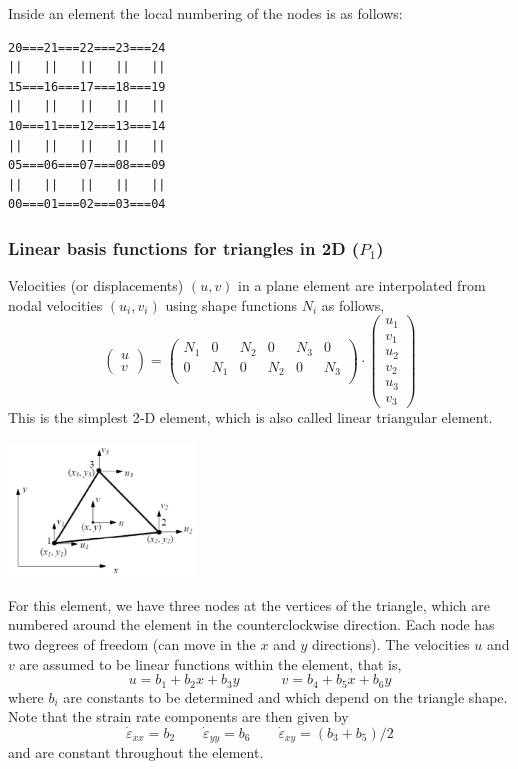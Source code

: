Inside an element the local numbering of the nodes is as follows:
\begin{verbatim}
20===21===22===23===24
||   ||   ||   ||   ||
15===16===17===18===19 
||   ||   ||   ||   || 
10===11===12===13===14 
||   ||   ||   ||   || 
05===06===07===08===09 
||   ||   ||   ||   || 
00===01===02===03===04 
\end{verbatim}




\subsubsection{Linear basis functions for triangles in 2D ($P_1$)}\label{ss:p1}

Velocities (or displacements) $(u,v)$ in a plane element are interpolated from nodal velocities
$(u_i,v_i)$ using shape functions $N_i$ as follows,
\[
\left(
\begin{array}{c}
u \\v
\end{array}
\right)
=
\left(
\begin{array}{cccccc}
N_1 & 0 & N_2 & 0 & N_3 & 0\\
0 & N_1 & 0 & N_2 & 0 & N_3\\
\end{array}
\right)
\cdot
\left(
\begin{array}{c}
u_1 \\ v_1 \\ u_2 \\ v_2 \\ u_3 \\ v_3
\end{array}
\right)
\]
This is the simplest 2‐D element, which is also called linear triangular element.
\begin{center}
\includegraphics[width=5cm]{images/shapefunctions/triangleFEM1}
\end{center}

For this element, we have three nodes at the vertices of the triangle, which are 
numbered around the element in the counterclockwise direction. 
Each node has two degrees of freedom (can move in the $x$ and $y$ directions). 
The velocities $u$ and $v$ are assumed to be linear functions within the element, that is, 
\[
u=b_1 +b_2x+b_3y
\quad\quad\quad
v=b_4 +b_5x+b_6y
\]
where $b_i$ are constants to be determined and which depend on the triangle shape.
Note that the strain rate components are then given by
\[
\dot\varepsilon_{xx}=b_2 
\quad\quad
\dot\varepsilon_{yy}=b_6 
\quad\quad
\dot\varepsilon_{xy}=(b_3+b_5)/2
\]
and are constant throughout the element.

